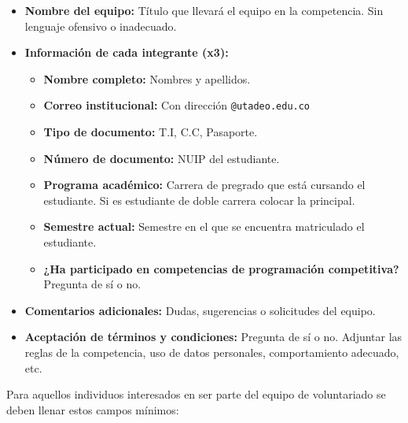 \documentclass{article}
\begin{document}
\begin{itemize}
  \item \textbf{Nombre del equipo:} Título que llevará el equipo en la competencia. Sin lenguaje ofensivo o inadecuado.
  \item \textbf{Información de cada integrante (x3):}
        \begin{itemize}
          \item \textbf{Nombre completo:} Nombres y apellidos.
          \item \textbf{Correo institucional:} Con dirección \texttt{@utadeo.edu.co}
          \item \textbf{Tipo de documento:} T.I, C.C, Pasaporte.
          \item \textbf{Número de documento:} NUIP del estudiante.
          \item \textbf{Programa académico:} Carrera de pregrado que está cursando el estudiante. Si es estudiante de doble carrera colocar la principal.
          \item \textbf{Semestre actual:} Semestre en el que se encuentra matriculado el estudiante.
          \item \textbf{¿Ha participado en competencias de programación competitiva?} Pregunta de sí o no.
        \end{itemize}
  \item \textbf{Comentarios adicionales:} Dudas, sugerencias o solicitudes del equipo.
  \item \textbf{Aceptación de términos y condiciones:} Pregunta de sí o no. Adjuntar las reglas de la competencia, uso de datos personales, comportamiento adecuado, etc.
\end{itemize}


Para aquellos individuos interesados en ser parte del equipo de voluntariado se deben llenar estos campos mínimos:
\end{document}
